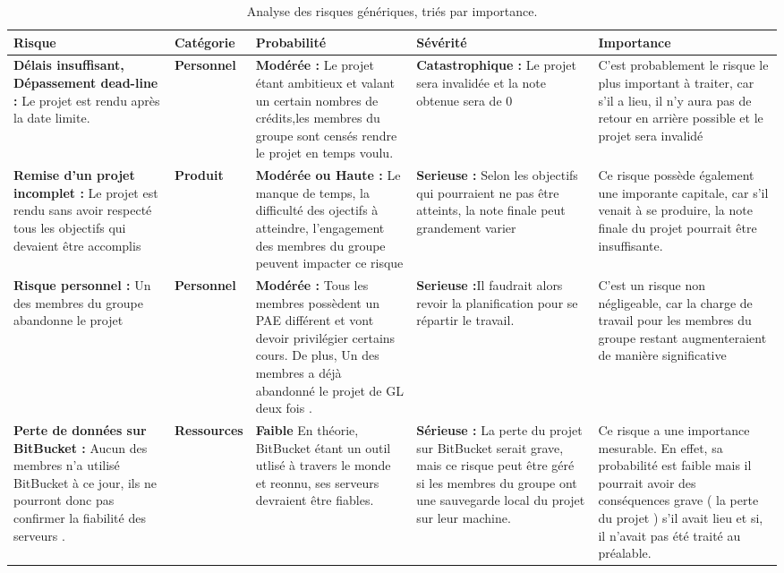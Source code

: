 \documentclass[]{article}
\begin{document}
\begin{table}[!htbp]
\begin{center}
\begin{tabular}{|p{3cm}|p{2.5cm}||p{3cm}|p{3cm}|p{2.5cm}|}
\hline
\textbf{Risque} & Catégorie & Probabilité & Sévérité & Importance\\
\hline\hline

\textbf{Délais insuffisant, Dépassement dead-line :} Le projet est rendu après la date limite. &
\textbf{Personnel}&\textbf{Modérée :} Le projet
étant ambitieux et valant un certain nombres de crédits,les membres du groupe sont censés rendre le projet en temps voulu.
& \textbf{Catastrophique :} Le projet sera invalidée et la note obtenue sera de 0 & C'est probablement le risque le plus important à traiter, car 
s'il a lieu, il n'y aura pas de retour en arrière possible et le projet sera invalidé\\
\hline
\textbf{Remise d'un projet incomplet :} Le projet est rendu sans avoir respecté tous les objectifs qui devaient être accomplis 
&\textbf{Produit}&\textbf{Modérée ou Haute :} Le manque de temps, la difficulté des ojectifs à atteindre, l'engagement des membres du groupe peuvent
impacter ce risque &\textbf{Serieuse :} Selon les objectifs qui pourraient ne pas être atteints, la note finale peut grandement varier  & Ce risque possède 
également une imporante capitale, car s'il venait à se produire, la note finale du projet pourrait être insuffisante.\\
\hline
\textbf{Risque personnel :} Un des membres du groupe abandonne le projet  &\textbf{Personnel} &\textbf{Modérée :}
Tous les membres possèdent un PAE différent et vont devoir privilégier certains cours. De plus, 
Un des membres a déjà abandonné le projet de GL deux fois . &\textbf{Serieuse :}Il faudrait alors revoir la
planification pour se répartir le travail. & C'est un risque non négligeable, car la charge de travail pour les membres du groupe restant augmenteraient
de manière significative\\
\hline
\textbf{Perte de données sur BitBucket :} Aucun des membres n'a utilisé BitBucket à ce jour,
ils ne pourront donc pas confirmer la fiabilité des serveurs .&\textbf{Ressources} &\textbf{Faible} En théorie, 
BitBucket étant un outil utlisé à travers le monde et reonnu, ses serveurs devraient être fiables.&\textbf{Sérieuse :} 
La perte du projet sur BitBucket serait grave, mais ce risque peut être géré si les membres du groupe ont une sauvegarde 
local du projet sur leur machine.& Ce risque a une importance mesurable. En effet, sa probabilité
est faible mais il pourrait avoir des conséquences grave ( la perte du projet ) s'il avait lieu et si, il n'avait pas été traité au préalable.\\
\hline
\end{tabular}
\end{center}
   \caption{Analyse des risques génériques, triés par importance.}
   \label{tab:risquesgeneriques}
\end{table}
\end{document}
